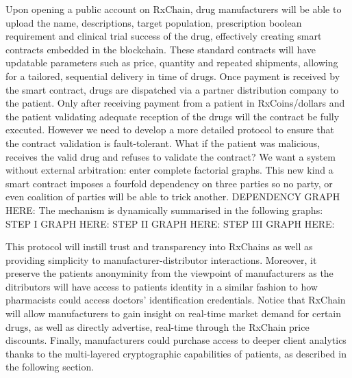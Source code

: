 
Upon opening a public account on RxChain, drug manufacturers will be
able to upload the name, descriptions, target population, prescription boolean
requirement and clinical trial success of the drug,
effectively creating smart contracts embedded in the blockchain. These
standard contracts will have updatable parameters such as price,
quantity and repeated shipments, allowing for a tailored, sequential
delivery in time of drugs.
Once payment is received by the smart contract, drugs are dispatched
via a partner distribution company to the patient. Only after
receiving payment from a patient in RxCoins/dollars and the patient
validating adequate reception of the drugs will the contract be fully
executed.
However we need to develop a more detailed protocol to ensure that the contract
validation is fault-tolerant. What if the patient was malicious,
receives the valid drug and refuses to validate the contract? We want
a system without external arbitration: enter complete factorial
graphs.
This new kind a smart contract imposes a fourfold dependency on three
parties so no party, or even coalition of parties will be able to
trick another.
DEPENDENCY GRAPH HERE:
The mechanism is dynamically summarised in the following graphs:
STEP I GRAPH HERE:
STEP II GRAPH HERE:
STEP III GRAPH HERE:

This protocol will instill trust and transparency into RxChains as well as providing
simplicity to manufacturer-distributor interactions. Moreover, it  preserve the
patients anonyminity from the viewpoint of manufacturers as the
ditributors will have access to patients identity in a similar fashion
to how pharmacists could access doctors' identification credentials.
Notice that RxChain  will allow manufacturers to gain insight on real-time
market demand for certain drugs,
as well as directly advertise, real-time through the RxChain price discounts. 
Finally, manufacturers could purchase access to deeper client
analytics thanks to the multi-layered cryptographic capabilities of
patients,
as described in the following section.


